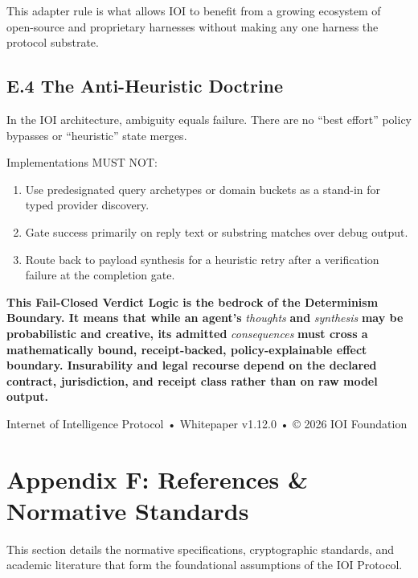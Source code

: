 \documentclass[
  11pt,
]{article}
\providecommand{\tightlist}{%
  \setlength{\itemsep}{0pt}\setlength{\parskip}{0pt}}
\begin{document}
This adapter rule is what allows IOI to benefit from a growing ecosystem
of open-source and proprietary harnesses without making any one harness
the protocol substrate.

\hypertarget{e.4-the-anti-heuristic-doctrine}{%
\subsection{E.4 The Anti-Heuristic
Doctrine}\label{e.4-the-anti-heuristic-doctrine}}

In the IOI architecture, ambiguity equals failure. There are no ``best
effort'' policy bypasses or ``heuristic'' state merges.

Implementations MUST NOT:

\begin{enumerate}
\def\labelenumi{\arabic{enumi}.}
\tightlist
\item
  Use predesignated query archetypes or domain buckets as a stand-in for
  typed provider discovery.
\item
  Gate success primarily on reply text or substring matches over debug
  output.
\item
  Route back to payload synthesis for a heuristic retry after a
  verification failure at the completion gate.
\end{enumerate}

\textbf{This Fail-Closed Verdict Logic is the bedrock of the Determinism
Boundary. It means that while an agent's }\emph{thoughts}\textbf{ and
}\emph{synthesis}\textbf{ may be probabilistic and creative, its admitted
}\emph{consequences}\textbf{ must cross a mathematically bound,
receipt-backed, policy-explainable effect boundary. Insurability and
legal recourse depend on the declared contract, jurisdiction, and
receipt class rather than on raw model output.}

Internet of Intelligence Protocol • Whitepaper v1.12.0 • © 2026 IOI
Foundation

\hypertarget{appendix-f-references-normative-standards}{%
\section{Appendix F: References \& Normative
Standards}\label{appendix-f-references-normative-standards}}

This section details the normative specifications, cryptographic
standards, and academic literature that form the foundational
assumptions of the IOI Protocol.
\end{document}
